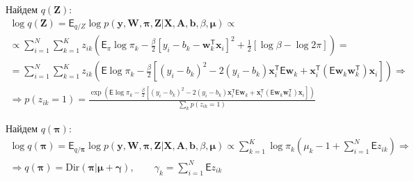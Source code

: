 \documentclass[12pt, twoside]{article}
\numberwithin{equation}{section}
\begin{document}
Найдем $q\left(\textbf{Z}\right)$:
\begin{equation}
\label{eq:st:14}
\begin{aligned}
\log q(\textbf{Z}) = \mathsf{E}_{q/Z}\log p(\textbf{y}, \textbf{W}, \bm{\pi}, \textbf{Z}|\textbf{X}, \textbf{A}, \textbf{b}, \beta, \bm{\mu}) \propto \\
\propto \sum_{i=1}^{N}\sum_{k=1}^{K} z_{ik}\left(\mathsf{E}_{\pi}\log\pi_k-\frac{\beta}{2}\left[y_i-b_k-\textbf{w}_k^{\mathsf{T}}\textbf{x}_i\right]^2 + \frac{1}{2}\left[\log\beta - \log2\pi\right]\right) = \\
=  \sum_{i=1}^{N}\sum_{k=1}^{K}z_{ik}\left(\mathsf{E}\log\pi_k - \frac{\beta}{2}\left[\left(y_i-b_k\right)^2 -2\left(y_i-b_k\right)\textbf{x}_i^{\mathsf{T}}\mathsf{E}\textbf{w}_k +\textbf{x}_i^{\mathsf{T}}\left(\mathsf{E}\textbf{w}_k\textbf{w}_k^{\mathsf{T}}\right)\textbf{x}_i\right]\right) \Rightarrow \\
\Rightarrow p(z_{ik} = 1) =  \frac{\exp\left(\mathsf{E}\log\pi_k - \frac{\beta}{2}\left[\left(y_i-b_k\right)^2 -2\left(y_i-b_k\right)\textbf{x}_i^{\mathsf{T}}\mathsf{E}\textbf{w}_k +\textbf{x}_i^{\mathsf{T}}\left(\mathsf{E}\textbf{w}_k\textbf{w}_k^{\mathsf{T}}\right)\textbf{x}_i\right] \right)}{\sum_k p(z_{ik}=1)}
\end{aligned}
\end{equation}

Найдем $q\left(\bm{\pi}\right)$:
\begin{equation}
\label{eq:st:15}
\begin{aligned}
\log q(\bm{\pi}) = \mathsf{E}_{q/\bm{\pi}}\log p(\textbf{y}, \textbf{W}, \bm{\pi}, \textbf{Z}|\textbf{X}, \textbf{A}, \textbf{b}, \beta, \bm{\mu})
\propto \sum_{k=1}^{K}\log\pi_k\left(\mu_k-1 +\sum_{i=1}^{N}\mathsf{E}z_{ik}\right) \Rightarrow \\
\Rightarrow q(\bm{\pi}) = \text{Dir}(\bm{\pi}|\bm{\mu}+\bm{\gamma}), \qquad \gamma_k = \sum_{i=1}^{N}\mathsf{E}z_{ik}
\end{aligned}
\end{equation}
\end{document}
